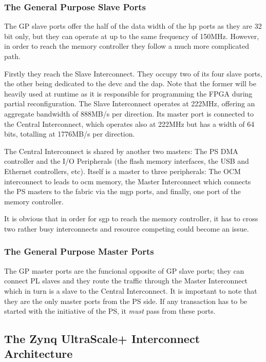 \subsubsection{The General Purpose Slave Ports}
\label{sect:sgp}

The GP slave ports offer the half of the data width 
of the \gls{hp} ports as they are 32 bit only,
but they can operate at up to the same frequency of 150MHz. 
However, in order to reach the memory controller 
they follow a much more complicated path.

Firstly they reach the Slave Interconnect. 
They occupy two of its four slave ports,
the other being dedicated to the 
\gls{devc} and the \gls{dap}.
Note that the former will be heavily used at runtime as it is responsible
for programming the FPGA during partial reconfiguration.
The Slave Interconnect operates at 222MHz, 
offering an aggregate bandwidth of 888MB/s per direction.
Its master port is connected to the Central Interconnect, 
which operates also at 222MHz but has a width of 64 bits, 
totalling at 1776MB/s per direction.

The Central Interconnect is shared by another two masters:
The PS DMA controller and the I/O Peripherals
(the flash memory interfaces, the USB and Ethernet controllers, etc).
Itself is a master to three peripherals:
The OCM interconnect to leads to \gls{ocm} memory, the Master Interconnect
which connects the PS masters to the \gls{fabric} via the \gls{mgp} ports,
and finally, one port of the memory controller.

It is obvious that in order for \gls{sgp} to reach the memory controller,
it has to cross two rather busy interconnects and resource competing
could become an issue.

\subsubsection{The General Purpose Master Ports}

The GP master ports are the funcional opposite of GP slave ports;
they can connect PL slaves and they route the traffic through the
Master Interconnect which in turn is a slave to the Central Interconnect.
It is important to note that they are the only master ports from the PS side.
If any transaction has to be started with the initiative of the PS,
it \emph{must} pass from these ports.

\subsection{The Zynq UltraScale+ Interconnect Architecture}

